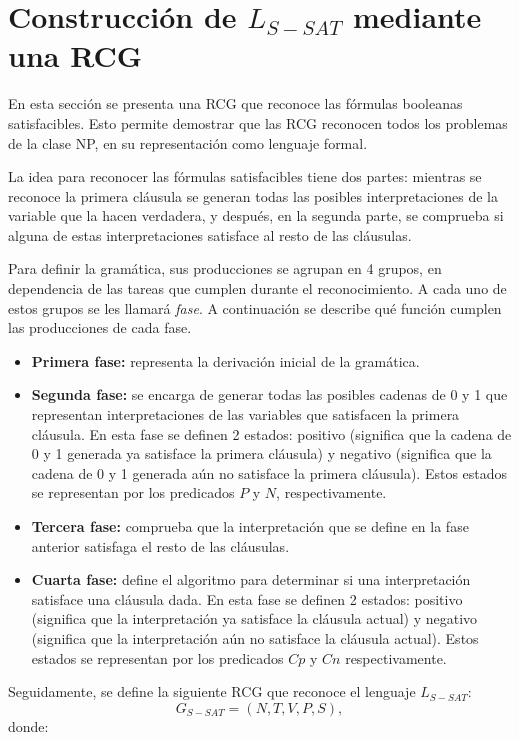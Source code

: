 \section{Construcción de $L_{S-SAT}$ mediante una RCG}

En esta sección se presenta una RCG que reconoce las fórmulas booleanas satisfacibles. Esto permite demostrar 
que las RCG reconocen todos los problemas de la clase NP, en su representación como lenguaje formal.

La idea para reconocer las fórmulas satisfacibles tiene dos partes: mientras se reconoce la primera cláusula se generan todas las posibles interpretaciones de la variable que la hacen verdadera, y después, en la segunda parte, se comprueba si alguna de estas interpretaciones satisface al resto de las cláusulas.

Para definir la gramática, sus producciones se agrupan en 4 grupos, en dependencia de las tareas que cumplen durante el reconocimiento. A cada uno de estos grupos se les llamará \textit{fase}. A continuación se describe qué función cumplen las producciones de cada fase.

\begin{itemize}
    \item \textbf{Primera fase:} representa la derivación inicial de la gramática.
    \item \textbf{Segunda fase:} se encarga de generar todas las posibles cadenas de 0 y 1 que representan interpretaciones de las variables que satisfacen la primera cláusula. En esta fase se definen 2 estados: positivo (significa que la cadena de 0 y 1 generada ya satisface la primera cláusula) y negativo (significa que la cadena de 0 y 1 generada aún no satisface la primera cláusula). Estos estados se representan por los predicados $P$ y $N$, respectivamente.
    \item \textbf{Tercera fase:} comprueba que la interpretación que se define en la fase anterior satisfaga el resto de las cláusulas.
    \item \textbf{Cuarta fase:} define el algoritmo para determinar si una interpretación satisface una cláusula dada. En esta fase se definen 2 estados: positivo (significa que la interpretación ya satisface la cláusula actual) y negativo (significa que la interpretación aún no satisface la cláusula actual). Estos estados se representan por los predicados $Cp$ y $Cn$ respectivamente.
\end{itemize}

Seguidamente, se define la siguiente RCG que reconoce el lenguaje $L_{S-SAT}$:
\[
    G_{S-SAT} = (N, T, V, P, S),
\]
donde:

